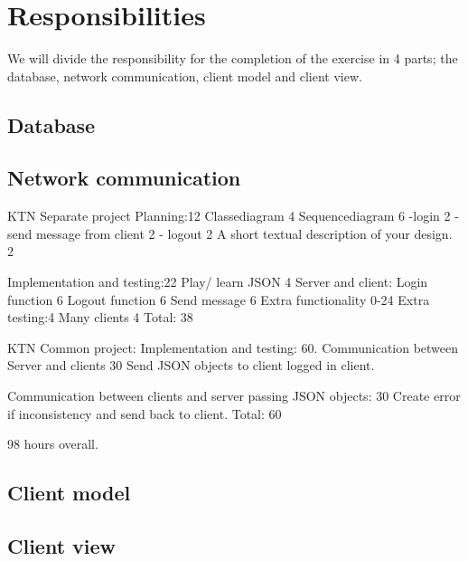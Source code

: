 \documentclass[a4paper, english, 12pt]{article}
\begin{document}
\section{Responsibilities}
We will divide the responsibility for the completion of the exercise in 4 parts; the database, network communication, 
client model and client view. 
\subsection{Database}

\subsection{Network communication}

KTN Separate project
Planning:12
	Classediagram 4
	Sequencediagram 6
		-login 2
		- send message from client 2
		- logout 2
	A short textual description of your design. 2

Implementation and testing:22
	Play/ learn JSON 4
	Server and client:
		Login function 6
		Logout function 6
		Send message 6
	Extra functionality 0-24
Extra testing:4
	Many clients 4
Total: 38

KTN Common project:
Implementation and testing: 60.
	Communication between Server and clients 30
		Send JSON objects to client logged in client. 
		
	Communication between clients and server passing JSON objects: 30
		Create error if inconsistency and send back to client. 
Total: 60

98 hours overall. 
\subsection{Client model}

\subsection{Client view}
\end{document}

